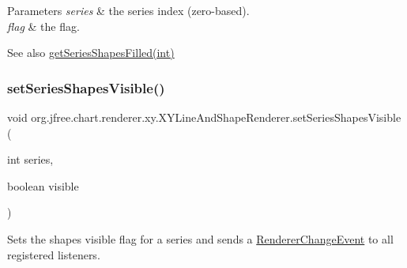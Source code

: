 \begin{DoxyParams}{Parameters}
{\em series} & the series index (zero-\/based). \\
\hline
{\em flag} & the flag.\\
\hline
\end{DoxyParams}
\begin{DoxySeeAlso}{See also}
\mbox{\hyperlink{classorg_1_1jfree_1_1chart_1_1renderer_1_1xy_1_1_x_y_line_and_shape_renderer_a8700a7f72b4dfbcdb1e2a7979a7a0840}{get\+Series\+Shapes\+Filled(int)}} 
\end{DoxySeeAlso}
\mbox{\label{classorg_1_1jfree_1_1chart_1_1renderer_1_1xy_1_1_x_y_line_and_shape_renderer_a314b2d8b5b0ac7741826221a54d66536}} 
\subsubsection{\texorpdfstring{set\+Series\+Shapes\+Visible()}{setSeriesShapesVisible()}\hspace{0.1cm}{\footnotesize\ttfamily [1/2]}}
{\footnotesize\ttfamily void org.\+jfree.\+chart.\+renderer.\+xy.\+X\+Y\+Line\+And\+Shape\+Renderer.\+set\+Series\+Shapes\+Visible (\begin{DoxyParamCaption}\item[{int}]{series,  }\item[{boolean}]{visible }\end{DoxyParamCaption})}

Sets the \textquotesingle{}shapes visible\textquotesingle{} flag for a series and sends a \mbox{\hyperlink{}{Renderer\+Change\+Event}} to all registered listeners.


